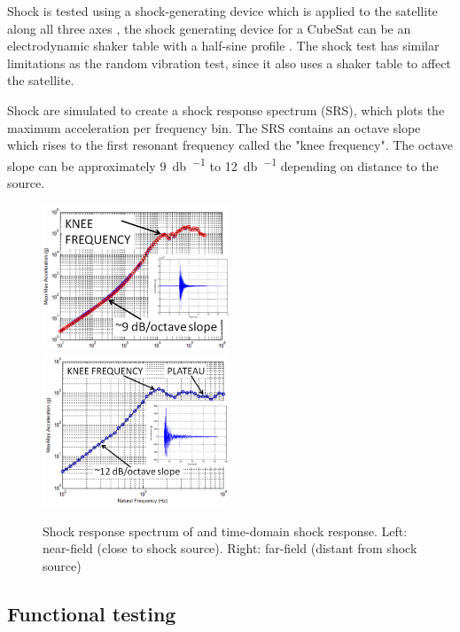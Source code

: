 \documentclass{report}
\begin{document}
Shock is tested using a shock-generating device which is applied to the satellite along all three axes \cite{nasa-gevs,nasa-pyroshock}, the shock generating device for a CubeSat can be an electrodynamic shaker table \cite{nieto2019cubesat} with a half-sine profile \cite{nieto2019cubesat}. The shock test has similar limitations as the random vibration test, since it also uses a shaker table to affect the satellite.

Shock are simulated to create a shock response spectrum (SRS), which plots the maximum acceleration per frequency bin. The SRS contains an octave slope which rises to the first resonant frequency called the "knee frequency". The octave slope can be approximately \SI{9}{\decibel\per\octave} to \SI{12}{\decibel\per\octave} depending on distance to the source.

\begin{figure}[H]
  \includegraphics[width=0.495\textwidth]{images/pyroshock2.png}
  \includegraphics[width=0.495\textwidth]{images/pyroshock1.png}
  \caption{Shock response spectrum of and time-domain shock response. Left: near-field (close to shock source). Right: far-field (distant from shock source) \cite{nasa-pyroshock}}
  \label{fig:pyroshock}
\end{figure}

\subsection{Functional testing}
\end{document}
